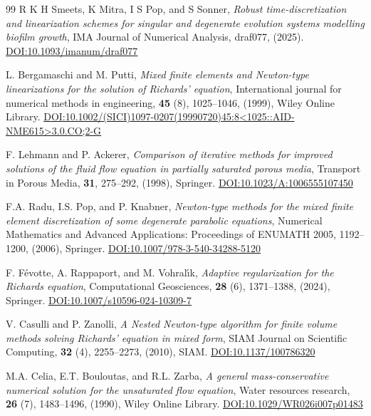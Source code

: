 \documentclass[review,11pt]{article}
\numberwithin{equation}{section}
\begin{document}
\begin{thebibliography}{99}
R K H Smeets, K Mitra, I S Pop, and S Sonner, \emph{Robust time-discretization and linearization schemes for singular and degenerate evolution systems modelling biofilm growth}, IMA Journal of Numerical Analysis, draf077, (2025). \href{https://doi.org/10.1093/imanum/draf077}{DOI:10.1093/imanum/draf077}


L. Bergamaschi and M. Putti, \emph{Mixed finite elements and Newton-type linearizations for the solution of {R}ichards' equation}, International journal for numerical methods in engineering, \textbf{45} (8), 1025--1046, (1999), Wiley Online Library. \href{https://doi.org/10.1002/(SICI)1097-0207(19990720)45:8<1025::AID-NME615>3.0.CO;2-G}
{DOI:10.1002/(SICI)1097-0207(19990720)45:8<1025::AID-NME615>3.0.CO;2-G}


F. Lehmann and P. Ackerer, \emph{Comparison of iterative methods for improved solutions of the fluid flow equation in partially saturated porous media}, Transport in Porous Media, \textbf{31}, 275--292, (1998), Springer. \href{https://doi.org/10.1023/A:1006555107450}{DOI:10.1023/A:1006555107450}

F.A. Radu, I.S. Pop, and P. Knabner, \emph{Newton-type methods for the mixed finite element discretization of some degenerate parabolic equations}, Numerical Mathematics and Advanced Applications: Proceedings of ENUMATH 2005, 1192--1200, (2006), Springer. \href{https://doi.org/10.1007/978-3-540-34288-5_120}{DOI:10.1007/978-3-540-34288-5120}

F. F{\'e}votte, A. Rappaport, and M. Vohral{\'\i}k, \emph{Adaptive regularization for the Richards equation}, Computational Geosciences, \textbf{28} (6), 1371--1388, (2024), Springer. \href{https://doi.org/10.1007/s10596-024-10309-7}{DOI:10.1007/s10596-024-10309-7}

V. Casulli and P. Zanolli, \emph{A Nested Newton-type algorithm for finite volume methods solving Richards' equation in mixed form}, SIAM Journal on Scientific Computing, \textbf{32} (4), 2255--2273, (2010), SIAM. \href{https://doi.org/10.1137/100786320}{DOI:10.1137/100786320}

M.A. Celia, E.T. Bouloutas, and R.L. Zarba, \emph{A general mass-conservative numerical solution for the unsaturated flow equation}, Water resources research, \textbf{26} (7), 1483--1496, (1990), Wiley Online Library. \href{https://doi.org/10.1029/WR026i007p01483}{DOI:10.1029/WR026i007p01483}



\end{thebibliography}
\end{document}
